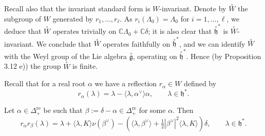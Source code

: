 \documentclass[12pt]{article}
\begin{document}
Recall also that the invariant standard form is $W$-invariant.
Denote by $\overset{\circ}{W}$ the subgroup of $W$ generated by $r_1,\dots,r_\ell$.
As $r_i(\Lambda_0)=\Lambda_0$ for $i=1,\dots,\ell$, we deduce that $\overset{\circ}{W}$
operates trivially on $\mathbb{C}\Lambda_0+\mathbb{C}\delta$; it is also clear
that $\overset{\circ}{\mathfrak{h}}^*$ is $\overset{\circ}{W}$-invariant. We conclude that
$\overset{\circ}{W}$ operates faithfully on $\overset{\circ}{\mathfrak{h}}^*$, and we can
identify $\overset{\circ}{W}$ with the Weyl group of the Lie algebra
$\overset{\circ}{\mathfrak{g}}$, operating on $\overset{\circ}{\mathfrak{h}}^*$. Hence
(by Proposition 3.12 e)) the group $\overset{\circ}{W}$ is finite.

Recall that for a real root $\alpha$ we have a reflection $r_\alpha \in W$ defined by
\[
    r_\alpha(\lambda) = \lambda - \langle \lambda, \alpha^\vee \rangle \alpha,
    \qquad \lambda \in \mathfrak{h}^*.
\]

\begin{lemma}[6.5]
    Let $\alpha \in \Delta^{\mathrm{re}}_+$ be such that $\beta := \delta - \alpha\in \Delta^{\mathrm{re}}_+$
    for some $\alpha$. Then
    \[
        r_\alpha r_\beta(\lambda)
        = \lambda + \langle \lambda, K \rangle \nu(\beta^\vee) - (\langle \lambda, \beta^\vee\rangle
        + \tfrac{1}{2}|\beta^\vee|^2 \langle \lambda, K \rangle)\delta,
        \qquad \lambda \in \mathfrak{h}^*.
    \]
\end{lemma}
\end{document}

